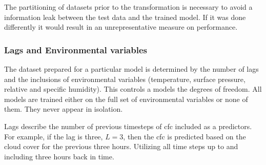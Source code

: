 The partitioning of datasets prior to the transformation is necessary to avoid a information leak between the test data and the trained model. If it was done differently it would result in an unrepresentative measure on performance.

\subsubsection{Lags and Environmental variables}
The dataset prepared for a particular model is determined by the number of lags and the inclusions of environmental variables (temperature, surface pressure, relative and specific humidity). This controls a models the degrees of freedom. All models are trained either on the full set of environmental variables or none of them. They never appear in isolation. 

Lags describe the number of previous timesteps of \acrshort{cfc} included as a predictors. For example, if the lag is three, $L=3$, then the \acrshort{cfc} is predicted based on the cloud cover for the previous three hours. Utilizing all time steps up to and including three hours back in time.


